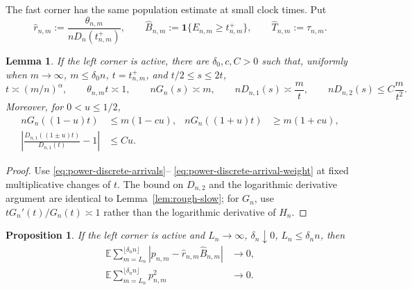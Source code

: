 \documentclass[11pt]{article}
\newtheorem{proposition}[theorem]{Proposition}
\newtheorem{lemma}[theorem]{Lemma}
\theoremstyle{remark}
\theoremstyle{plain}
\newcommand{\E}{\mathbb E}
\newcommand{\one}{\mathbf 1}
\begin{document}
The fast corner has the same population estimate at small clock times.  Put
\begin{equation}\label{eq:early-r-B}
 \widehat r_{n,m}:=
 \frac{\theta_{n,m}}{nD_n(t_{n,m}^+)},
 \qquad
 \widehat B_{n,m}:=\one\{E_{n,m}\ge t_{n,m}^+\},
 \qquad
 \widehat T_{n,m}:=\tau_{n,m}.
\end{equation}

\begin{lemma}
\label{lem:rough-early}
If the left corner is active, there are $\delta_0,c,C>0$ such that,
uniformly when $m\to\infty$, $m\le\delta_0n$,
$t=t_{n,m}^+$, and $t/2\le s\le2t$,
\begin{equation}\label{eq:rough-early}
 t\asymp(m/n)^\alpha,\qquad
 \theta_{n,m}t\asymp1,\qquad
 nG_n(s)\asymp m,\qquad
 nD_{n,1}(s)\asymp\frac mt,\qquad
 nD_{n,2}(s)\le C\frac m{t^2}.
\end{equation}
Moreover, for $0<u\le1/2$,
\begin{align}
 nG_n((1-u)t)&\le m(1-cu),&
 nG_n((1+u)t)&\ge m(1+cu),
 \label{eq:early-count-separation}\\
 \left|\frac{D_{n,1}((1\pm u)t)}{D_{n,1}(t)}-1\right|
 &\le Cu.&&\label{eq:early-weight-stability}
\end{align}
\end{lemma}

\begin{proof}
Use \eqref{eq:power-discrete-arrivals}--
\eqref{eq:power-discrete-arrival-weight} at fixed multiplicative changes of
$t$.  The bound on $D_{n,2}$ and the logarithmic derivative argument are
identical to Lemma~\ref{lem:rough-slow}; for $G_n$, use
$tG_n'(t)/G_n(t)\asymp1$ rather than the logarithmic derivative of $H_n$.
\end{proof}

\begin{proposition}
\label{prop:early-compensator}
If the left corner is active and $L_n\to\infty$, $\delta_n\downarrow0$,
$L_n\le\delta_n n$, then
\begin{align}
 \E\sum_{m=L_n}^{\lfloor\delta_n n\rfloor}
 \left|p_{n,m}-\widehat r_{n,m}\widehat B_{n,m}\right|&\longrightarrow0,
 \label{eq:fast-L1}\\
 \E\sum_{m=L_n}^{\lfloor\delta_n n\rfloor}p_{n,m}^2
 &\longrightarrow0.\label{eq:fast-squares}
\end{align}
\end{proposition}
\end{document}
